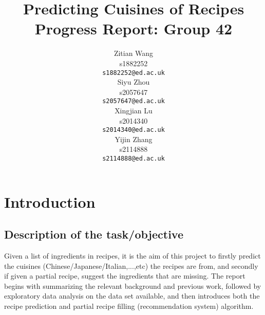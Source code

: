 \documentclass{article}
\title{Predicting Cuisines of Recipes\\Progress Report: Group 42}
\author{
  Zitian Wang\\
  s1882252\\
  \texttt{s1882252@ed.ac.uk} \\
  \And
  Siyu Zhou\\
  s2057647\\
  \texttt{s2057647@ed.ac.uk} \\
 \And
  Xingjian Lu\\
  s2014340\\
  \texttt{s2014340@ed.ac.uk} \\
 \And
  Yijin Zhang\\
  s2114888\\
  \texttt{s2114888@ed.ac.uk}\\
}
\begin{document}
\maketitle
%
%
%
%
%
%
\section{Introduction}
\subsection{Description of the task/objective}

Given a list of ingredients in recipes, it is the aim of this project to firstly predict the cuisines (Chinese/Japanese/Italian,...,etc) the recipes are from, and secondly if given a partial recipe, suggest the ingredients that are missing. The report begins with summarizing the relevant background and previous work, followed by exploratory data analysis on the data set available, and then introduces both the recipe prediction and partial recipe filling (recommendation system) algorithm. 
\end{document}
